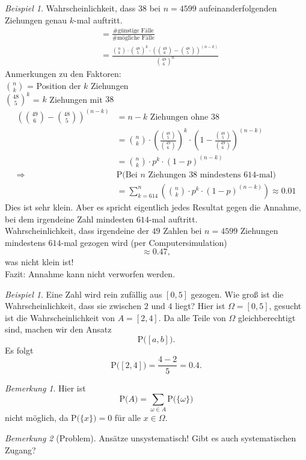 \documentclass[a4paper,12pt,fleqn]{scrartcl}
\newcommand{\prob}[1]{\text{P(} #1 \text{)}}
\newcommand{\impl}{\Rightarrow}
\theoremstyle{definition}
\theoremstyle{plain}
\theoremstyle{remark}
\newtheorem*{bemerkung}{Bemerkung}
\newtheorem{beispiel}[definition]{Beispiel}
\begin{document}
\begin{beispiel}
Wahrscheinlichkeit, dass $38$ bei $n = 4599$ aufeinanderfolgenden Ziehungen genau $k$-mal auftritt.
\begin{align*}
&= \frac{\text{\# günstige Fälle}}{\text{\# mögliche Fälle}} \\
&= \frac{\binom{n}{k} \cdot \binom{48}{5}^k \cdot (\binom{49}{6} - \binom{48}{5})^{(n-k)} }{\binom{49}{6}^n}
\end{align*}
Anmerkungen zu den Faktoren: \\ 
$\binom{n}{k}$ = Position der $k$ Ziehungen \\
$\binom{48}{5}^k$ = $k$ Ziehungen mit $38$ \newpage
\begin{align*}
(\binom{49}{6} - \binom{48}{5})^{(n-k)} &= n-k \text{ Ziehungen ohne } 38 \\
&= \binom{n}{k} \cdot (\frac{\binom{48}{5}}{\binom{49}{6}})^k \cdot (1 - \frac{\binom{48}{5}}{\binom{49}{6}})^{(n-k)} \\
&= \binom{n}{k} \cdot p^k \cdot (1-p)^{(n-k)} \\
\impl &\prob{\text{Bei } n \text{ Ziehungen } 38 \text{ mindestens } 614\text{-mal}} \\
&=\sum_{k=614}^n (\binom{n}{k} \cdot p^k \cdot (1-p)^{(n-k)}) \approx 0.01
\end{align*}
Dies ist sehr klein. Aber es spricht eigentlich jedes Resultat gegen die Annahme, bei dem irgendeine Zahl mindesten $614$-mal auftritt. \\
Wahrscheinlichkeit, dass irgendeine der $49$ Zahlen bei $n=4599$ Ziehungen mindestens $614$-mal gezogen wird (per Computersimulation) 
\[\approx 0.47,\]
was nicht klein ist! \\
Fazit: Annahme kann nicht verworfen werden.
\end{beispiel}

\begin{beispiel}
Eine Zahl wird rein zufällig aus $\left[ 0,5\right]$ gezogen. Wie groß ist die Wahrscheinlichkeit, dass sie zwischen $2$ und $4$ liegt?  Hier ist $\Omega=\left[ 0,5\right]$, gesucht ist die Wahrscheinlichkeit von $A=\left[ 2,4\right]$. Da alle Teile von $\Omega$ \glqq gleichberechtigt\grqq \, sind, machen wir den Ansatz
\[\prob{\left[ a,b\right]}.\]
Es folgt
\[\prob{\left[ 2,4\right]}=\frac{4-2}{5}=0.4.\]
\begin{bemerkung}
Hier ist
\[\prob{A}=\sum_{\omega\in A}\prob{\{\omega \} }\]
nicht möglich, da $\prob{\{ x\} } = 0$ für alle $x\in\Omega$.
\end{bemerkung}
\end{beispiel}
\begin{bemerkung}[Problem]
Ansätze unsystematisch! Gibt es auch systematischen Zugang?
\end{bemerkung}
\end{document}
